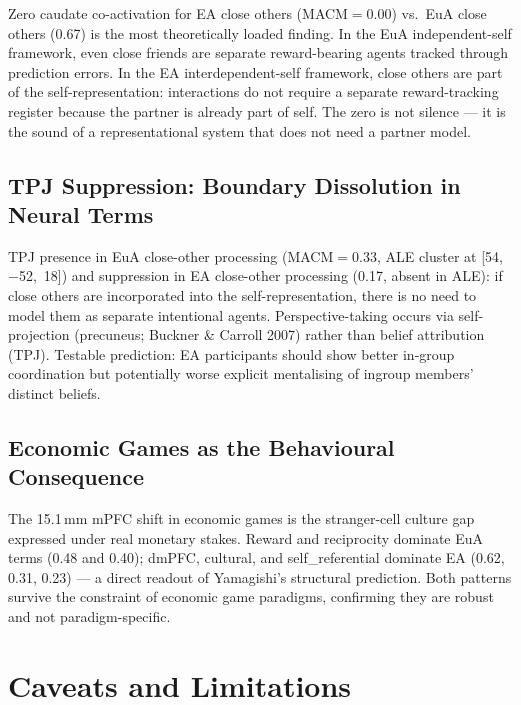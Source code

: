 \documentclass[11pt,a4paper]{report}
\begin{document}
Zero caudate co-activation for EA close others (MACM$=0.00$) vs.\ EuA close others (0.67)
is the most theoretically loaded finding. In the EuA independent-self framework, even close
friends are separate reward-bearing agents tracked through prediction errors. In the EA
interdependent-self framework, close others are part of the self-representation: interactions
do not require a separate reward-tracking register because the partner is already part of self.
The zero is not silence --- it is the sound of a representational system that does not need
a partner model.

\section*{TPJ Suppression: Boundary Dissolution in Neural Terms}

TPJ presence in EuA close-other processing (MACM$=0.33$, ALE cluster at [54,~$-$52,~18])
and suppression in EA close-other processing (0.17, absent in ALE): if close others are
incorporated into the self-representation, there is no need to model them as separate
intentional agents. Perspective-taking occurs via self-projection (precuneus; Buckner \&
Carroll 2007) rather than belief attribution (TPJ). Testable prediction: EA participants
should show better in-group coordination but potentially worse explicit mentalising of
ingroup members' distinct beliefs.

\section*{Economic Games as the Behavioural Consequence}

The 15.1\,mm mPFC shift in economic games is the stranger-cell culture gap expressed under
real monetary stakes. Reward and reciprocity dominate EuA terms (0.48 and 0.40); dmPFC,
cultural, and self\_referential dominate EA (0.62, 0.31, 0.23) --- a direct readout of
Yamagishi's structural prediction. Both patterns survive the constraint of economic game
paradigms, confirming they are robust and not paradigm-specific.

\chapter{Caveats and Limitations}
\end{document}
